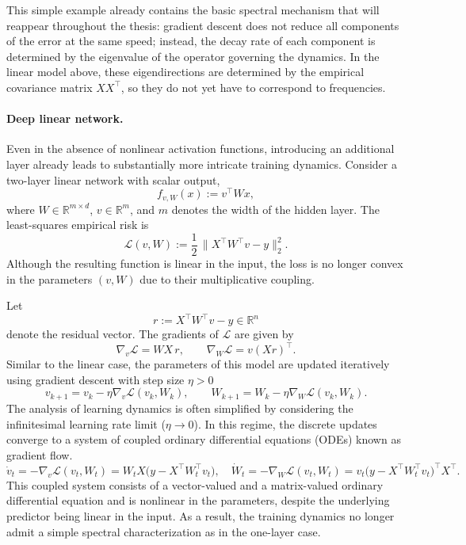 This simple example already contains the basic spectral mechanism that will
reappear throughout the thesis: gradient descent does not reduce all components
of the error at the same speed; instead, the decay rate of each component is
determined by the eigenvalue of the operator governing the dynamics. In the
linear model above, these eigendirections are determined by the empirical
covariance matrix \(XX^\top\), so they do not yet have to correspond to
frequencies.

\paragraph{Deep linear network.}
Even in the absence of nonlinear activation functions, introducing an additional
layer already leads to substantially more intricate training dynamics. Consider
a two-layer linear network with scalar output,
\begin{equation}
	f_{v,W}(x) := v^\top W x,
\end{equation}
where $W \in \mathbb{R}^{m \times d}$, $v \in \mathbb{R}^{m}$, and $m$ denotes the
width of the hidden layer. The least-squares empirical risk is
\begin{equation}
	\mathcal{L}(v,W)
	:= \frac{1}{2}\,\bigl\|X^\top W^\top v - y\bigr\|_2^2 .
\end{equation}
Although the resulting function is linear in the input, the loss is no longer
convex in the parameters $(v,W)$ due to their multiplicative coupling.

Let
\begin{equation}
	r := X^\top W^\top v - y \in \mathbb{R}^n
\end{equation}
denote the residual vector. The gradients of $\mathcal{L}$ are given by
\begin{equation}
	\nabla_v \mathcal{L} = W X\, r,
	\qquad
	\nabla_W \mathcal{L} = v (X r)^\top .
\end{equation}
Similar to the linear case, the parameters of this model are updated
iteratively using gradient descent with step size $\eta > 0$
\begin{equation*}
	v_{k+1} = v_k - \eta \nabla_v \mathcal{L}(v_k, W_k), \qquad
	W_{k+1} = W_k - \eta \nabla_W \mathcal{L}(v_k, W_k).
\end{equation*}
The analysis of learning dynamics is often simplified by considering the infinitesimal
learning rate limit ($\eta \to 0$). In this regime, the discrete updates
converge to a system of coupled ordinary differential equations (ODEs) known as
gradient flow.
\begin{equation}
	\dot v_t = -\nabla_v \mathcal{L}(v_t,W_t)
	= W_t X \bigl(y - X^\top W_t^\top v_t\bigr),
	\quad
	\dot W_t = -\nabla_W \mathcal{L}(v_t,W_t)
	= v_t \bigl(y - X^\top W_t^\top v_t\bigr)^\top X^\top .
\end{equation}
This coupled system consists of a vector-valued and a matrix-valued ordinary
differential equation and is nonlinear in the parameters, despite the underlying
predictor being linear in the input. As a result, the training dynamics no longer
admit a simple spectral characterization as in the one-layer case.

